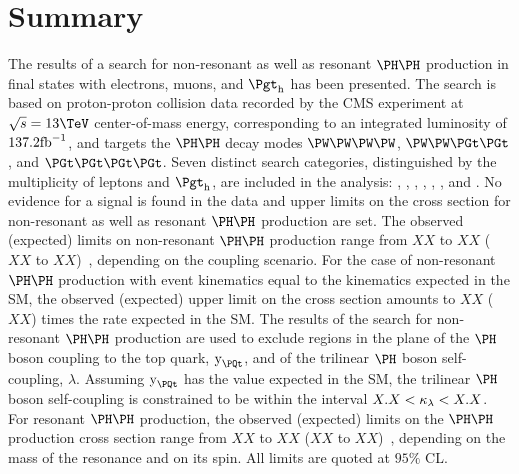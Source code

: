 \section{Summary}
\label{sec:summary}

The results of a search for non-resonant as well as resonant $\HH$ production in final states with electrons, muons, and $\tauh$ has been presented.
The search is based on proton-proton collision data recorded by the CMS experiment at $\sqrt{s} = 13\TeV$ center-of-mass energy,
corresponding to an integrated luminosity of $137.2\text{fb}^{-1}$,
and targets the $\HH$ decay modes $\PW\PW\PW\PW$, $\PW\PW\PGt\PGt$, and $\PGt\PGt\PGt\PGt$.
Seven distinct search categories, distinguished by the multiplicity of leptons and $\tauh$, are included in the analysis:
\llss, \lllnot, \llll, \lllt, \lltt, \lttt, and \noltttt.
No evidence for a signal is found in the data and upper limits on the cross section for non-resonant as well as resonant $\HH$ production are set.
The observed (expected) limits on non-resonant $\HH$ production range from $XX$ to $XX$ ($XX$ to $XX$)~\pb, depending on the coupling scenario.
For the case of non-resonant $\HH$ production with event kinematics equal to the kinematics expected in the SM,
the observed (expected) upper limit on the cross section amounts to $XX$ ($XX$) times the rate expected in the SM.
The results of the search for non-resonant $\HH$ production are used to exclude regions in the plane of the $\PHiggs$ boson coupling to the top quark, $\yt$,
and of the trilinear $\PHiggs$ boson self-coupling, $\lambda$.
Assuming $\yt$ has the value expected in the SM, the trilinear $\PHiggs$ boson self-coupling is constrained to be within the interval $X.X < \kappa_{\lambda} < X.X$.
For resonant $\HH$ production, the observed (expected) limits on the $\HH$ production cross section range from $XX$ to $XX$ ($XX$ to $XX$)~\pb, 
depending on the mass of the resonance and on its spin.
All limits are quoted at $95\%$ CL.
